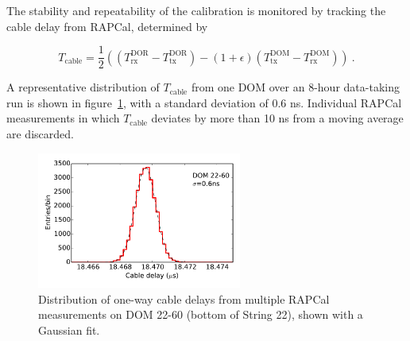 The stability and repeatability of the calibration is monitored by
tracking the cable delay from RAPCal, determined by

\begin{equation}
  T_{\mathrm{cable}} = \frac{1}{2} \left( ( T_{\mathrm{rx}}^{\mathrm{DOR}} -
  T_{\mathrm{tx}}^{\mathrm{DOR}} ) - (1+\epsilon)(T_{\mathrm{tx}}^{\mathrm{DOM}} -
  T_{\mathrm{rx}}^{\mathrm{DOM}} )\right) \ .
\end{equation}

\noindent A representative distribution of $T_{\mathrm{cable}}$ from one DOM over an 8-hour
data-taking run is shown in figure~\ref{fig:rapcal_cable_len}, with a
standard deviation of 0.6 ns.  Individual RAPCal measurements in which $T_{\mathrm{cable}}$
deviates by more than 10 ns from a moving average are discarded.

\begin{figure}[!h]
 \centering
 \includegraphics[width=0.6\textwidth]{graphics/dom/rapcal/tcal_hist_22-60.pdf}
 \caption{Distribution of one-way cable delays from multiple RAPCal
   measurements on DOM 22-60 (bottom of String 22), shown with a Gaussian fit.}
 \label{fig:rapcal_cable_len}
\end{figure}

